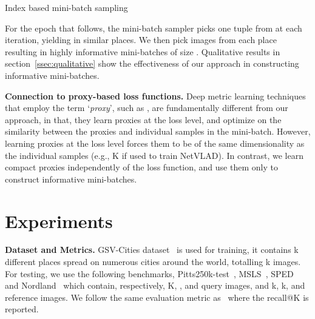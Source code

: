 \documentclass{bmvc2k}
\begin{document}
\begin{algorithm}
\BlankLine
\nl  {}

\nl  {}

\caption{Index based mini-batch sampling}\label{algo_index}
\end{algorithm}

For the epoch that follows, the mini-batch sampler picks one tuple from  at each iteration, yielding in  similar places. We then pick  images from each place resulting in highly informative mini-batches of size . Qualitative results in section~\ref{ssec:qualitative} show the effectiveness of our approach in constructing informative mini-batches. 

\vspace{5pt}
\noindent\textbf{Connection to proxy-based loss functions.} Deep metric learning techniques that employ the term ‘\textit{proxy}’, such as \cite{kim2020proxy, yang2022hierarchical, yao2022pcl}, are fundamentally different from our approach, in that, they learn proxies at the loss level, and optimize on the similarity between the proxies and individual samples in the mini-batch. However, learning proxies at the loss level forces them to be of the same dimensionality as the individual samples (e.g., K if used to train NetVLAD). In contrast, we learn compact proxies independently of the loss function, and use them only to construct informative mini-batches.
\section{Experiments}\label{sec:exp}
\textbf{Dataset and Metrics.} GSV-Cities dataset~\cite{ali2022gsv} is used for training, it contains k different places spread on numerous cities around the world, totalling k images. For testing, we use the following  benchmarks,  Pitts250k-test~\cite{torii2013visual}, MSLS~\cite{warburg2020mapillary}, SPED~\cite{zaffar2021vpr} and Nordland~\cite{zaffar2021vpr} which contain, respectively, K, ,  and  query images, and k, k,  and  reference images. We follow the same evaluation metric as~\cite{arandjelovic2016netvlad, warburg2020mapillary, zaffar2021vpr} where the recall@K is reported.
\end{document}
